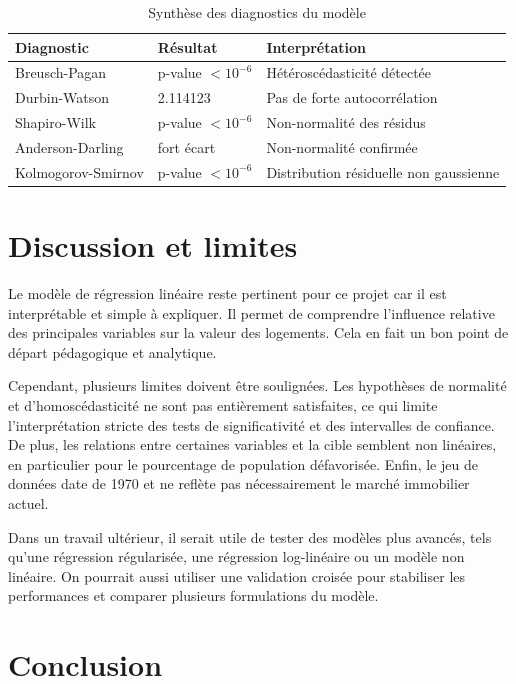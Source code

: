 \documentclass[a4paper,12pt]{article}
\begin{document}
\begin{table}[H]
\centering
\caption{Synthèse des diagnostics du modèle}
\begin{tabular}{p{4.5cm}p{2.8cm}p{5.5cm}}
\toprule
Diagnostic & Résultat & Interprétation \\
\midrule
Breusch-Pagan & p-value $< 10^{-6}$ & Hétéroscédasticité détectée \\
Durbin-Watson & 2.114123 & Pas de forte autocorrélation \\
Shapiro-Wilk & p-value $< 10^{-6}$ & Non-normalité des résidus \\
Anderson-Darling & fort écart & Non-normalité confirmée \\
Kolmogorov-Smirnov & p-value $< 10^{-6}$ & Distribution résiduelle non gaussienne \\
\bottomrule
\end{tabular}
\end{table}

\section{Discussion et limites}

Le modèle de régression linéaire reste pertinent pour ce projet car il est interprétable et simple à expliquer. Il permet de comprendre l’influence relative des principales variables sur la valeur des logements. Cela en fait un bon point de départ pédagogique et analytique.

Cependant, plusieurs limites doivent être soulignées. Les hypothèses de normalité et d’homoscédasticité ne sont pas entièrement satisfaites, ce qui limite l’interprétation stricte des tests de significativité et des intervalles de confiance. De plus, les relations entre certaines variables et la cible semblent non linéaires, en particulier pour le pourcentage de population défavorisée. Enfin, le jeu de données date de 1970 et ne reflète pas nécessairement le marché immobilier actuel.

Dans un travail ultérieur, il serait utile de tester des modèles plus avancés, tels qu’une régression régularisée, une régression log-linéaire ou un modèle non linéaire. On pourrait aussi utiliser une validation croisée pour stabiliser les performances et comparer plusieurs formulations du modèle.

\section{Conclusion}
\end{document}
